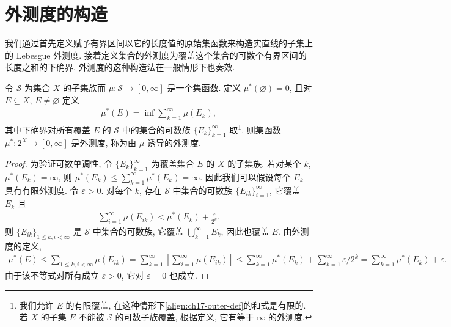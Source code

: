 \documentclass[../../main.tex]{subfiles}
\begin{document}
\section{外测度的构造}\label{section:ch17-outer-measure-construction}

我们通过首先定义赋予有界区间以它的长度值的原始集函数来构造实直线的子集上的 Lebesgue 外测度. 接着定义集合的外测度为覆盖这个集合的可数个有界区间的长度之和的下确界. 外测度的这种构造法在一般情形下也奏效.

\begin{theorem}\label{theorem:ch17-induced-outer-measure}
令 $\mathcal{S}$ 为集合 $X$ 的子集族而 $\mu:\mathcal{S}\to[0,\infty]$ 是一个集函数. 定义 $\mu^*(\varnothing)=0$, 且对 $E\subseteq X$, $E\neq\varnothing$ 定义
\begin{align}
\mu^*(E)=\inf\sum_{k=1}^{\infty}\mu(E_{k}),\label{align:ch17-outer-def}
\end{align}
其中下确界对所有覆盖 $E$ 的 $\mathcal{S}$ 中的集合的可数族 $\{E_{k}\}_{k=1}^{\infty}$ 取\footnote{我们允许 $E$ 的有限覆盖, 在这种情形下\eqref{align:ch17-outer-def}的和式是有限的. 若 $X$ 的子集 $E$ 不能被 $\mathcal{S}$ 的可数子族覆盖, 根据定义, 它有等于 $\infty$ 的外测度.}. 则集函数 $\mu^*:2^{X}\to[0,\infty]$ 是外测度, 称为由 $\mu$ 诱导的外测度.
\end{theorem}

\begin{proof}
为验证可数单调性, 令 $\{E_{k}\}_{k=1}^{\infty}$ 为覆盖集合 $E$ 的 $X$ 的子集族. 若对某个 $k$, $\mu^*(E_{k})=\infty$, 则 $\mu^*(E_{k})\leqslant\sum_{k=1}^{\infty}\mu^*(E_{k})=\infty$. 因此我们可以假设每个 $E_{k}$ 具有有限外测度. 令 $\varepsilon>0$. 对每个 $k$, 存在 $\mathcal{S}$ 中集合的可数族 $\{E_{ik}\}_{i=1}^{\infty}$, 它覆盖 $E_{k}$ 且
\begin{align*}
\sum_{i=1}^{\infty}\mu(E_{ik})<\mu^*(E_{k})+\frac{\varepsilon}{2^{k}}.
\end{align*}
则 $\{E_{ik}\}_{1\leqslant k,i<\infty}$ 是 $\mathcal{S}$ 中集合的可数族, 它覆盖 $\bigcup_{k=1}^{\infty}E_{k}$, 因此也覆盖 $E$. 由外测度的定义,
\begin{align*}
\mu^*(E)\leqslant\sum_{1\leqslant k,i<\infty}\mu(E_{ik})=\sum_{k=1}^{\infty}\left[\sum_{i=1}^{\infty}\mu(E_{ik})\right]\leqslant\sum_{k=1}^{\infty}\mu^*(E_{k})+\sum_{k=1}^{\infty}\varepsilon/2^{k}=\sum_{k=1}^{\infty}\mu^*(E_{k})+\varepsilon.
\end{align*}
由于该不等式对所有成立 $\varepsilon>0$, 它对 $\varepsilon=0$ 也成立.
\end{proof}
\end{document}
